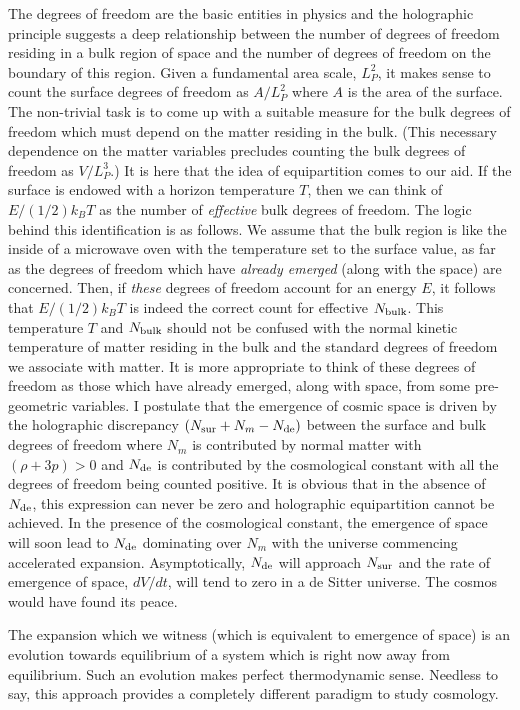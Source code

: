 \documentclass[aps,prd,showpacs,nofootinbib,floats,floatfix,preprintnumbers,groupedaddress,twocolumn]{revtex4}
\begin{document}
The degrees of freedom are the basic entities in physics and the holographic principle suggests a deep relationship between the number of degrees of freedom residing in a bulk region of space and the number of degrees of freedom on the boundary of this region. Given a fundamental area  scale, $L_P^2$, it makes sense to count the surface degrees of freedom as $A/L_P^2$ where $A$ is the area of the surface.
The non-trivial task is to come up with a suitable measure for the bulk degrees of freedom which must depend on the matter residing in the bulk. (This necessary dependence on the matter variables precludes counting the bulk degrees of freedom as $V/L_P^3$.) 
It is here that the idea of equipartition comes to our aid. If the surface is endowed with a horizon temperature $T$, then we can think of $E/(1/2)k_BT$ as the number of \textit{effective} bulk degrees of freedom. The logic behind this identification is as follows. We assume that the bulk region is like the inside of a microwave oven with the temperature set to the surface value, as far as the degrees of freedom which have \textit{already emerged} (along with the space) are concerned. Then, if \textit{these} degrees of freedom account for an energy $E$, it follows that  $E/(1/2)k_BT$ is indeed the correct count for effective $N_{\rm bulk}$. This temperature $T$ and $N_{\rm bulk}$ should not be confused with the normal kinetic temperature of matter residing in the bulk and the standard degrees of freedom we associate with matter. It is more appropriate to think of these degrees of freedom as those which have already emerged, along with space, from some pre-geometric variables. 
I postulate  that the emergence of cosmic space is driven by the holographic discrepancy $(N_{\rm sur}  + N_m - N_{\rm de})$ between the surface and bulk degrees of freedom
where $N_m$ is contributed by normal matter with $(\rho + 3p)>0$ and $N_{\rm de}$ is contributed by the cosmological constant with all the degrees of freedom being counted positive.
It is obvious that in the absence of $N_{\rm de}$, this expression can never be zero and holographic equipartition cannot be achieved. In the presence of the cosmological constant, the emergence of space will soon lead to $N_{\rm de}$ dominating over $N_m$ with the universe commencing accelerated expansion. Asymptotically, $N_{\rm de}$ will approach $N_{\rm sur}$ 
and the rate of emergence of space, $dV/dt$, will tend to zero in a de Sitter universe. The cosmos would have found its peace. 

The expansion which we witness (which is equivalent to emergence of space) is an evolution towards equilibrium of a system which is right now away from equilibrium. Such an evolution makes perfect thermodynamic sense. Needless to say, this approach provides a completely different paradigm to study cosmology.
\end{document}
